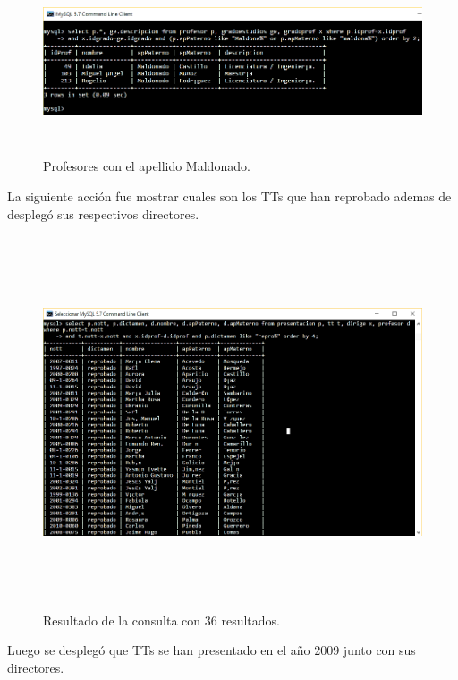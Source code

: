 \documentclass[12pt, titlepage]{article}
\begin{document}
		\begin{figure}[H]
		\begin{center}
			\includegraphics[width=16cm, height=5.5cm]{img/cinco.png}
			\caption{Profesores con el apellido Maldonado.}
			\label{fig:ejercicio6}
		\end{center}
	\end{figure}
	La siguiente acción fue mostrar cuales son los TTs que han reprobado ademas de desplegó sus respectivos directores.
	\begin{figure}[H]
		\begin{center}
			\includegraphics[width=16cm, height=11cm]{img/seis.png}
			\caption{Resultado de la consulta con 36 resultados.}
			\label{fig:ejercicio7}
		\end{center}
	\end{figure}
	Luego se desplegó que TTs se han presentado en el año 2009 junto con sus directores.
\end{document}

